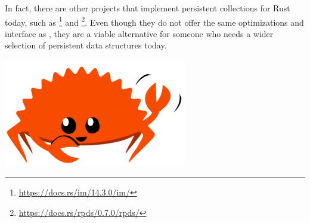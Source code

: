 In fact, there are other projects that implement persistent collections for Rust today, such as \imrs{}\footnote{\url{https://docs.rs/im/14.3.0/im/}} and \rpds{}\footnote{\url{https://docs.rs/rpds/0.7.0/rpds/}}. Even though they do not offer the same optimizations and interface as \pvecrs{}, they are a viable alternative for someone who needs a wider selection of persistent data structures today.

\begin{center}
    \vspace*{5cm}
    \includegraphics[width=8cm, angle=0, trim=10 10 10 10, clip]{images/ferris-waving.png}
\end{center}
